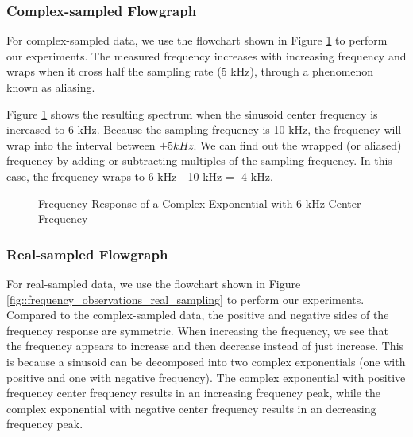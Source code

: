 \documentclass{article}
\begin{document}
\subsubsection{Complex-sampled Flowgraph}

For complex-sampled data, we use the flowchart shown in Figure \ref{fig::freq_observations_complex_6k_center_freq} to perform our experiments. The measured frequency increases with increasing frequency and wraps when it cross half the sampling rate (5 kHz), through a phenomenon known as aliasing.

Figure \ref{fig::freq_observations_complex_6k_center_freq} shows the resulting spectrum when the sinusoid center frequency is increased to 6 kHz. Because the sampling frequency is 10 kHz, the frequency will wrap into the interval between $\pm 5 kHz$. We can find out the wrapped (or aliased) frequency by adding or subtracting multiples of the sampling frequency. In this case, the frequency wraps to 6 kHz - 10 kHz = -4 kHz.

\begin{figure}[H]
	\centerline{}
	\caption{Frequency Response of a Complex Exponential with 6 kHz Center Frequency}
	\label{fig::freq_observations_complex_6k_center_freq}
\end{figure}

\subsubsection{Real-sampled Flowgraph}

For real-sampled data, we use the flowchart shown in Figure \ref{fig::frequency_observations_real_sampling} to perform our experiments. Compared to the complex-sampled data, the positive and negative sides of the frequency response are symmetric. When increasing the frequency, we see that the frequency appears to increase and then decrease instead of just increase. This is because a sinusoid can be decomposed into two complex exponentials (one with positive and one with negative frequency). The complex exponential with positive frequency center frequency results in an increasing frequency peak, while the complex exponential with negative center frequency results in an decreasing frequency peak.
\end{document}
